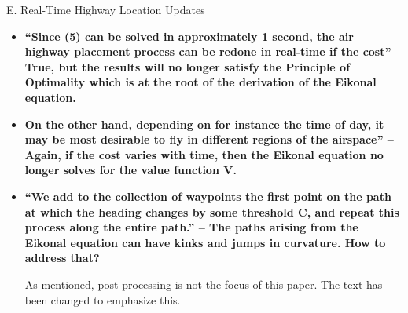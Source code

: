 \documentclass[submit]{aiaa-pretty}
\begin{document}
E. Real-Time Highway Location Updates
\begin{itemize}
\item \textbf{``Since (5) can be solved in approximately 1 second, the air highway placement process can be redone in real-time if the cost'' – True, but the results will no longer satisfy the Principle of Optimality which is at the root of the derivation of the Eikonal equation.}

\item \textbf{On the other hand, depending on for instance the time of day, it may be most desirable to fly in different regions of the airspace'' – Again, if the cost varies with time, then the Eikonal equation no longer solves for the value function V.}
\item \textbf{``We add to the collection of waypoints the first point on the path at which the heading changes by some threshold C, and repeat this process along the entire path.'' – The paths arising from the Eikonal equation can have kinks and jumps in curvature. How to address that?}

As mentioned, post-processing is not the focus of this paper. The text has been changed to emphasize this.
\end{itemize}
\end{document}
